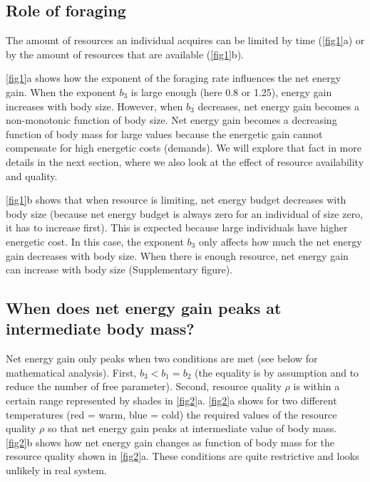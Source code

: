 
\subsection*{Role of foraging}
The amount of resources an individual acquires can be limited by time (\cref{fig1}a) or by the amount of resources that are available (\cref{fig1}b).

\cref{fig1}a shows how the exponent of the foraging rate influences the net energy gain.
When the exponent $b_3$ is large enough (here 0.8 or 1.25), energy gain increases with body size.
However, when $b_3$ decreases, net energy gain becomes a non-monotonic function of body size.
Net energy gain becomes a decreasing function of body mass for large values because the energetic gain cannot compensate for high energetic costs (demands).
We will explore that fact in more details in the next section, where we also look at the effect of resource availability and quality.     

\cref{fig1}b shows that when resource is limiting, net energy budget decreases with body size (because net energy budget is always zero for an individual of size zero, it has to increase first).
This is expected because large individuals have higher energetic cost.
In this case, the exponent $b_3$ only affects how much the net energy gain decreases with body size. 
When there is enough resource, net energy gain can increase with body size (Supplementary figure). 

\subsection*{When does net energy gain peaks at intermediate body mass?}
Net energy gain only peaks when two conditions  are met (see below for mathematical analysis).
First, $b_3 < b_1 = b_2$ (the equality is by assumption and to reduce the number of free parameter).
Second, resource quality $\rho$ is within a certain range represented by shades in \cref{fig2}a.
\cref{fig2}a shows for two different temperatures (red = warm, blue = cold) the required values of the resource quality $\rho$ so that net energy gain peaks at intermediate value of body mass.
\cref{fig2}b shows how net energy gain changes as function of body mass for the resource quality shown in \cref{fig2}a.
These conditions are quite restrictive and looks unlikely in real system.

